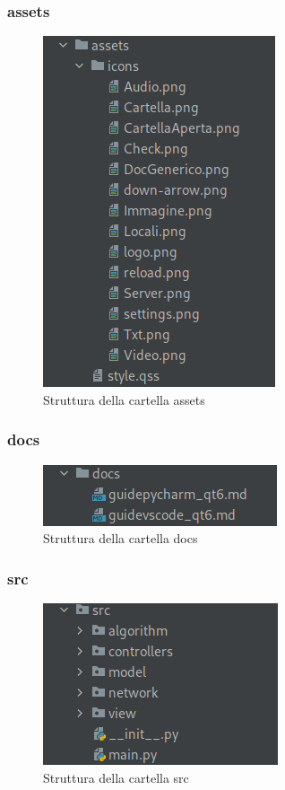 \subsubsection{assets}    
\begin{figure}[H]
    \centering
    \includegraphics[scale = 0.5]{components/img/struttura-cartella-assets.png}
    \caption{Struttura della cartella assets}
    \label{fig:Struttura della cartella assets}
\end{figure}   
\subsubsection{docs}    
\begin{figure}[H]
    \centering
    \includegraphics[scale = 0.5]{components/img/struttura-cartella-docs.png}
    \caption{Struttura della cartella docs}
    \label{fig:Struttura della cartella docs}
\end{figure}    
\subsubsection{src} \label{sec:cartelle-src}
\begin{figure}[H]
    \centering
    \includegraphics[scale = 0.5]{components/img/struttura-cartella-src.png}
    \caption{Struttura della cartella src}
    \label{fig:Struttura della cartella src}
\end{figure}    
